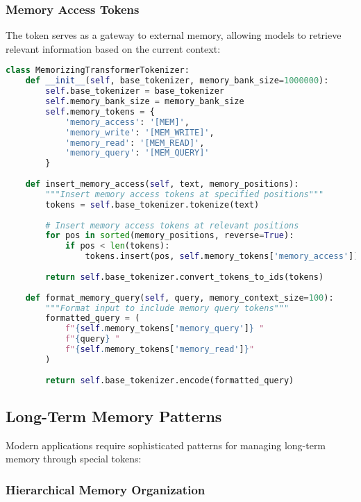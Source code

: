 \subsubsection{Memory Access Tokens}

The  token serves as a gateway to external memory, allowing models to retrieve relevant information based on the current context:

\begin{lstlisting}[language=Python, caption=Memory access token implementation]
class MemorizingTransformerTokenizer:
    def __init__(self, base_tokenizer, memory_bank_size=1000000):
        self.base_tokenizer = base_tokenizer
        self.memory_bank_size = memory_bank_size
        self.memory_tokens = {
            'memory_access': '[MEM]',
            'memory_write': '[MEM_WRITE]',
            'memory_read': '[MEM_READ]',
            'memory_query': '[MEM_QUERY]'
        }
    
    def insert_memory_access(self, text, memory_positions):
        """Insert memory access tokens at specified positions"""
        tokens = self.base_tokenizer.tokenize(text)
        
        # Insert memory access tokens at relevant positions
        for pos in sorted(memory_positions, reverse=True):
            if pos < len(tokens):
                tokens.insert(pos, self.memory_tokens['memory_access'])
        
        return self.base_tokenizer.convert_tokens_to_ids(tokens)
    
    def format_memory_query(self, query, memory_context_size=100):
        """Format input to include memory query tokens"""
        formatted_query = (
            f"{self.memory_tokens['memory_query']} "
            f"{query} "
            f"{self.memory_tokens['memory_read']}"
        )
        
        return self.base_tokenizer.encode(formatted_query)
\end{lstlisting}

\subsection{Long-Term Memory Patterns}

Modern applications require sophisticated patterns for managing long-term memory through special tokens:

\subsubsection{Hierarchical Memory Organization}

